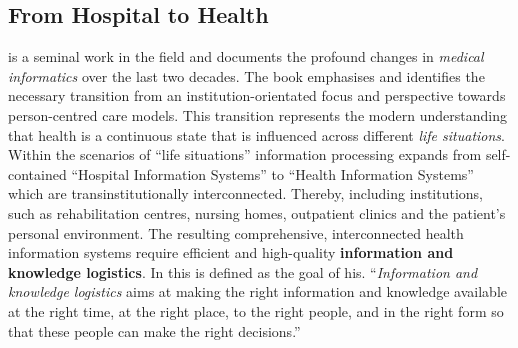 \subsection{From Hospital to Health}
\citet{bb2} is a seminal work in the field and documents the profound changes in \textit{medical informatics} over the last two decades.
The book emphasises and identifies the necessary transition from an institution-orientated focus and perspective towards person-centred care models.
This transition represents the modern understanding that health is a continuous state that is influenced across different \textit{life situations}.
Within the scenarios of \enquote{life situations} information processing expands from self-contained \enquote{Hospital Information Systems} to \enquote{Health Information Systems} which are transinstitutionally interconnected.
Thereby, including institutions, such as rehabilitation centres, nursing homes, outpatient clinics and the patient's personal environment. 
The resulting comprehensive, interconnected health information systems require efficient and high-quality \textbf{information and knowledge logistics}.
In \citet{bb2} this is defined as the goal of \ac{his}. 
\enquote{\textit{Information and knowledge logistics} aims at making the right information and knowledge available at the right time, at the right place, to the right people,
and in the right form so that these people can make the right decisions.} \citep[p.19]{bb2}

